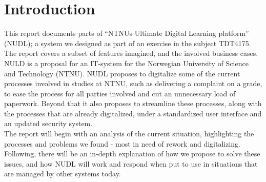 \section{Introduction}


This report documents parts of “NTNUs Ultimate Digital Learning platform” (NUDL); a system we designed as part of an exercise in the subject TDT4175. The report covers a subset of features imagined, and the involved business cases. NULD is a proposal for an IT-system for the Norwegian University of Science and Technology (NTNU). NUDL proposes to digitalize some of the current processes involved in studies at NTNU, such as delivering a complaint on a grade, to ease the process for all parties involved and cut an unnecessary load of paperwork. Beyond that it also proposes to streamline these processes, along with the processes that are already digitalized, under a standardized user interface and an updated security system.\\

\noindent
The report will begin with an analysis of the current situation, highlighting the processes and problems we found - most in need of rework and digitalizing. Following, there will be an in-depth explanation of how we propose to solve these issues, and how NUDL will work and respond when put to use in situations that are managed by other systems today.
